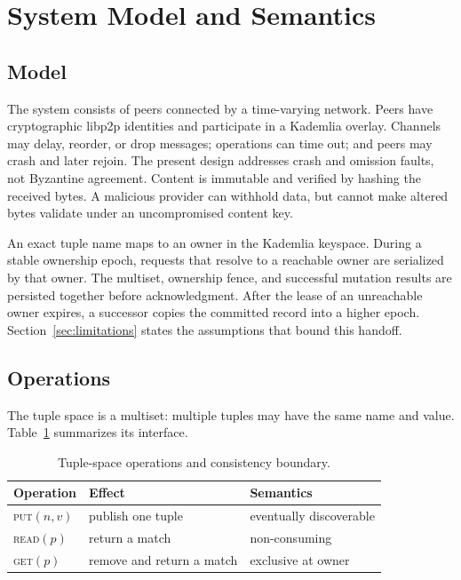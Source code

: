 \documentclass[conference]{IEEEtran}
\newcommand{\putop}{\textsc{put}\xspace}
\newcommand{\readop}{\textsc{read}\xspace}
\newcommand{\getop}{\textsc{get}\xspace}
\begin{document}
\section{System Model and Semantics}
\label{sec:model}

\subsection{Model}

The system consists of peers connected by a time-varying network. Peers have
cryptographic libp2p identities and participate in a Kademlia overlay. Channels
may delay, reorder, or drop messages; operations can time out; and peers may
crash and later rejoin. The present design addresses crash and omission faults,
not Byzantine agreement. Content is immutable and verified by hashing the
received bytes. A malicious provider can withhold data, but cannot make altered
bytes validate under an uncompromised content key.

An exact tuple name maps to an owner in the Kademlia keyspace. During a stable
ownership epoch, requests that resolve to a reachable owner are serialized by
that owner. The multiset, ownership fence, and successful mutation results are
persisted together before acknowledgment. After the lease of an unreachable
owner expires, a successor copies the committed record into a higher epoch.
Section~\ref{sec:limitations} states the assumptions that bound this handoff.

\subsection{Operations}

The tuple space is a multiset: multiple tuples may have the same name and
value. Table~\ref{tab:semantics} summarizes its interface.

\begin{table}[t]
\caption{Tuple-space operations and consistency boundary.}
\label{tab:semantics}
\centering
\begin{tabular}{@{}lll@{}}
\toprule
Operation & Effect & Semantics \\
\midrule
\putop$(n,v)$ & publish one tuple & eventually discoverable \\
\readop$(p)$ & return a match & non-consuming \\
\getop$(p)$ & remove and return a match & exclusive at owner \\
\bottomrule
\end{tabular}
\end{table}
\end{document}
